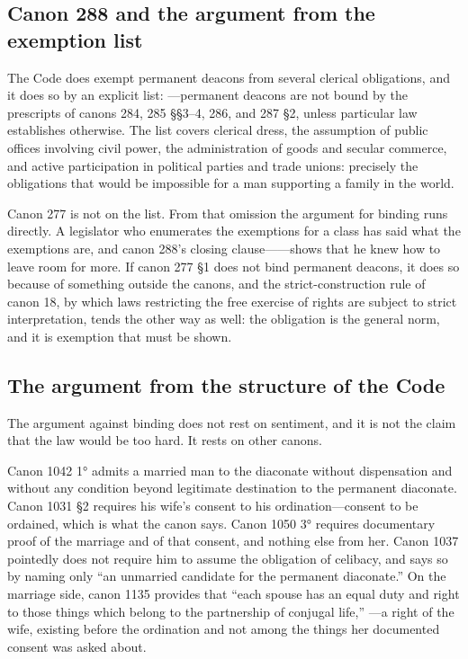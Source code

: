 \subsection{Canon 288 and the argument from the exemption list}

The Code does exempt permanent deacons from several clerical obligations, and it does so by an explicit list: ---permanent deacons are not bound by the prescripts of canons 284, 285 §§3--4, 286, and 287 §2, unless particular law establishes otherwise. The list covers clerical dress, the assumption of public offices involving civil power, the administration of goods and secular commerce, and active participation in political parties and trade unions: precisely the obligations that would be impossible for a man supporting a family in the world.

Canon 277 is not on the list. From that omission the argument for binding runs directly. A legislator who enumerates the exemptions for a class has said what the exemptions are, and canon 288's closing clause------shows that he knew how to leave room for more. If canon 277 §1 does not bind permanent deacons, it does so because of something outside the canons, and the strict-construction rule of canon 18, by which laws restricting the free exercise of rights are subject to strict interpretation, tends the other way as well: the obligation is the general norm, and it is exemption that must be shown.

\subsection{The argument from the structure of the Code}

The argument against binding does not rest on sentiment, and it is not the claim that the law would be too hard. It rests on other canons.

Canon 1042 1° admits a married man to the diaconate without dispensation and without any condition beyond legitimate destination to the permanent diaconate. Canon 1031 §2 requires his wife's consent to his ordination---consent to be ordained, which is what the canon says. Canon 1050 3° requires documentary proof of the marriage and of that consent, and nothing else from her. Canon 1037 pointedly does not require him to assume the obligation of celibacy, and says so by naming only ``an unmarried candidate for the permanent diaconate.'' On the marriage side, canon 1135 provides that ``each spouse has an equal duty and right to those things which belong to the partnership of conjugal life,'' ---a right of the wife, existing before the ordination and not among the things her documented consent was asked about.

